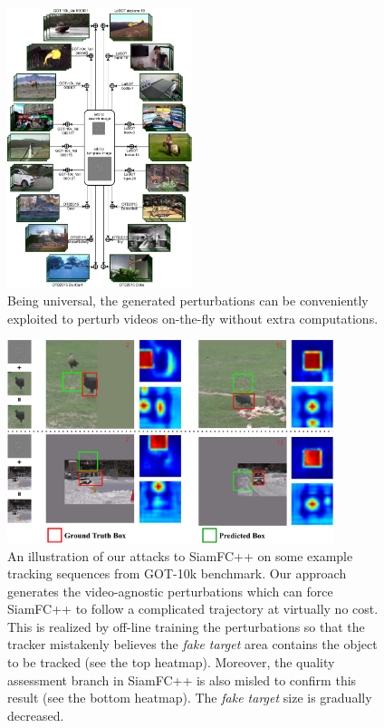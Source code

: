\documentclass[journal]{IEEEtran}
\begin{document}
\begin{figure}[t]
  \centering
  \includegraphics[width=0.48\textwidth]{images_imperceptible/UAP.pdf}
  \caption{Being universal, the generated perturbations can be conveniently exploited to perturb videos on-the-fly without extra computations.} 
  \label{fig:UAP}
\end{figure}

\begin{figure}[t]
  \centering
  \includegraphics[width=0.85\textwidth]{images_imperceptible/1_v8.pdf}
  \caption{An illustration of our attacks to SiamFC++ on some example tracking sequences from GOT-10k benchmark. Our approach generates the video-agnostic perturbations which can force SiamFC++ to follow a complicated trajectory at virtually no cost. This is realized by off-line training the perturbations so that the tracker mistakenly believes the \textit{fake target} area contains the object to be tracked (see the top heatmap). Moreover, the quality assessment branch in SiamFC++ is also misled to confirm this result (see the bottom heatmap). The \textit{fake target} size is gradually decreased.} 
  \label{fig:1}
\end{figure}
\end{document}
